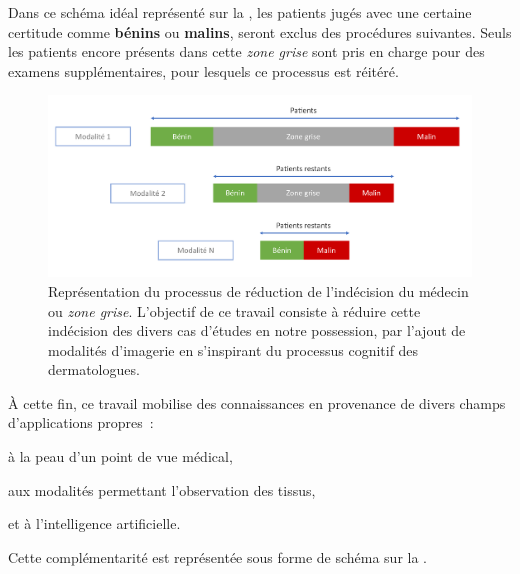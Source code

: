 Dans ce schéma idéal représenté sur la , les patients jugés avec une certaine certitude comme \textbf{bénins} ou \textbf{malins}, seront exclus des procédures suivantes. Seuls les patients encore présents dans cette \textit{zone grise} sont pris en charge pour des examens supplémentaires, pour lesquels ce processus est réitéré.\par 

\begin{figure}[H]
    \centering
    \includegraphics[width=\linewidth]{contents/i_introduction/resources/scheme_reduce_indecision.pdf}
    \caption{Représentation du processus de réduction de l'indécision du médecin ou \textit{zone grise}. L'objectif de ce travail consiste à réduire cette indécision des divers cas d'études en notre possession, par l'ajout de modalités d'imagerie en s'inspirant du processus cognitif des dermatologues.}
    \label{fig:scheme_reduce_indecision}
\end{figure}\par

À cette fin, ce travail mobilise des connaissances en provenance de divers champs d'applications propres~:
\begin{inlinerate}
    \item à la peau d'un point de vue médical, 
    \item aux modalités permettant l'observation des tissus,
    \item et à l'intelligence artificielle.
\end{inlinerate} Cette complémentarité est représentée sous forme de schéma sur la .\par

